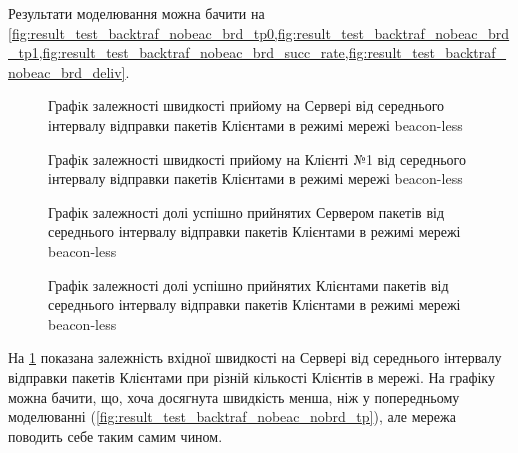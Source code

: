\documentclass[a4paper,ukrainian,utf8,nocolumnsxix,nocolumnxxxii,nocolumnxxxi,floatsection,equationsection]{eskdtext}
\newcommand{\longcaption}[1]{\captionsetup{style=figureLongCaption}\caption{#1}}
\newcommand{\blm}[0]{beacon-less\xspace}
\begin{document}
Результати моделювання можна бачити на \cref{fig:result_test_backtraf_nobeac_brd_tp0,fig:result_test_backtraf_nobeac_brd_tp1,fig:result_test_backtraf_nobeac_brd_succ_rate,fig:result_test_backtraf_nobeac_brd_deliv}.

\begin{figure}[htbp]
	\centering
	\longcaption{\label{fig:result_test_backtraf_nobeac_brd_tp0}Графiк залежності швидкості прийому на Сервері від середнього інтервалу відправки пакетів Клієнтами в режимі мережі \blm}
\end{figure}

\begin{figure}[htbp]
	\centering
	\longcaption{\label{fig:result_test_backtraf_nobeac_brd_tp1}Графiк залежності швидкості прийому на Клієнті №1 від середнього інтервалу відправки пакетів Клієнтами в режимі мережі \blm}
\end{figure}

\begin{figure}[htbp]
	\centering
	\longcaption{\label{fig:result_test_backtraf_nobeac_brd_succ_rate}Графік залежності долі успішно прийнятих Сервером пакетів від середнього інтервалу відправки пакетів Клієнтами в режимі мережі \blm}
\end{figure}


\begin{figure}[htbp]
	\centering
	\longcaption{\label{fig:result_test_backtraf_nobeac_brd_deliv}Графік залежності долі успішно прийнятих Клієнтами пакетів від середнього інтервалу відправки пакетів Клієнтами в режимі мережі \blm}
\end{figure}

На \cref{fig:result_test_backtraf_nobeac_brd_tp0} показана залежність вхідної швидкості на Сервері від середнього інтервалу відправки пакетів Клієнтами при різній кількості Клієнтів в мережі. На графіку можна бачити, що, хоча досягнута швидкість менша, ніж у попередньому моделюванні (\cref{fig:result_test_backtraf_nobeac_nobrd_tp}), але мережа поводить себе таким самим чином.
\end{document}
